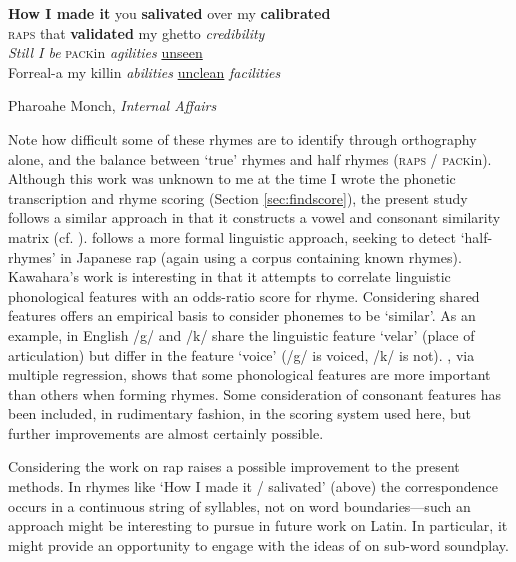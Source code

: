 \documentclass[twocolumn, switch]{article} %
\begin{document}
\begin{adjustwidth}{0.1\linewidth}{0.1\linewidth}
  \footnotesize
\textbf{How I made it} you \textbf{salivated} over my \textbf{calibrated}\\
\textsc{raps} that \textbf{validated} my ghetto \emph{credibility}\\
\emph{Still I be} \textsc{pack}in \emph{agilities} \underline{unseen}\\
Forreal-a my killin \emph{abilities} \underline{unclean} \emph{facilities}\textellipsis\\
\begin{flushright}
Pharoahe Monch, \emph{Internal Affairs}
\end{flushright}
\end{adjustwidth}
Note how difficult some of these rhymes are to identify through orthography
alone, and the balance between `true' rhymes and half rhymes (\textsc{raps} /
\textsc{pack}in). Although this work was unknown to me at the time I wrote the
phonetic transcription and rhyme scoring (Section \ref{sec:findscore}), the
present study follows a similar approach in that it constructs a vowel and
consonant similarity matrix (cf. ).
 follows a more formal linguistic approach, seeking
to detect `half-rhymes' in Japanese rap (again using a corpus containing known
rhymes). Kawahara's work is interesting in that it attempts to correlate
linguistic phonological features with an odds-ratio score for rhyme. Considering
shared features offers an empirical basis to consider phonemes to be `similar'.
As an example, in English /g/ and /k/ share the linguistic feature `velar'
(place of articulation) but differ in the feature `voice' (/g/ is voiced,
/k/ is not). , via multiple regression, shows
that some phonological features are more important than others when forming
rhymes. Some consideration of consonant features has been included, in
rudimentary fashion, in the scoring system used here, but further improvements
are almost certainly possible.

Considering the work on rap raises a possible improvement to the present
methods. In rhymes like `How I made it / salivated' (above) the correspondence
occurs in a continuous string of syllables, not on word boundaries---such an
approach might be interesting to pursue in future work on Latin. In
particular, it might provide an opportunity to engage with the ideas of
 on sub-word soundplay.
\end{document}
